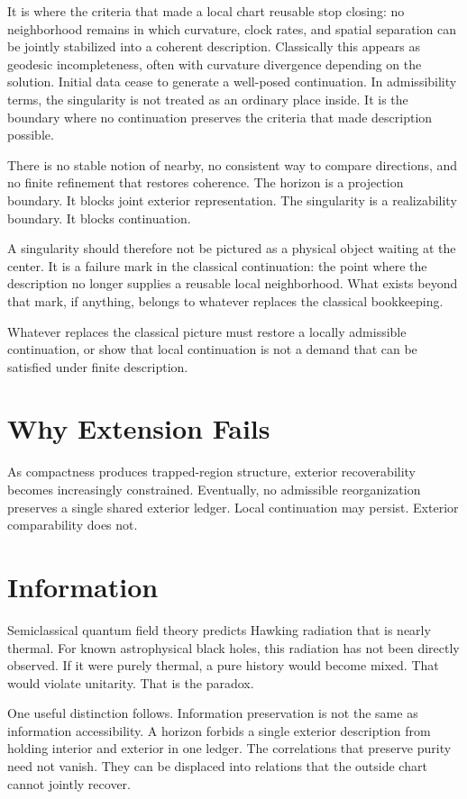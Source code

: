 \documentclass[11pt,twoside,openright]{book}
\begin{document}
It is where the criteria that made a local chart reusable stop closing: no neighborhood remains in which curvature, clock rates, and spatial separation can be jointly stabilized into a coherent description. Classically this appears as geodesic incompleteness, often with curvature divergence depending on the solution. Initial data cease to generate a well-posed continuation. In admissibility terms, the singularity is not treated as an ordinary place inside. It is the boundary where no continuation preserves the criteria that made description possible.

There is no stable notion of nearby, no consistent way to compare directions, and no finite refinement that restores coherence. The horizon is a projection boundary. It blocks joint exterior representation. The singularity is a realizability boundary. It blocks continuation.

A singularity should therefore not be pictured as a physical object waiting at the center. It is a failure mark in the classical continuation: the point where the description no longer supplies a reusable local neighborhood. What exists beyond that mark, if anything, belongs to whatever replaces the classical bookkeeping.

Whatever replaces the classical picture must restore a locally admissible continuation, or show that local continuation is not a demand that can be satisfied under finite description.

\section*{Why Extension Fails}

As compactness produces trapped-region structure, exterior recoverability becomes increasingly constrained. Eventually, no admissible reorganization preserves a single shared exterior ledger. Local continuation may persist. Exterior comparability does not.

\section*{Information}

Semiclassical quantum field theory predicts Hawking radiation that is nearly thermal. For known astrophysical black holes, this radiation has not been directly observed. If it were purely thermal, a pure history would become mixed. That would violate unitarity. That is the paradox.

One useful distinction follows. Information preservation is not the same as information accessibility. A horizon forbids a single exterior description from holding interior and exterior in one ledger. The correlations that preserve purity need not vanish. They can be displaced into relations that the outside chart cannot jointly recover.
\end{document}
